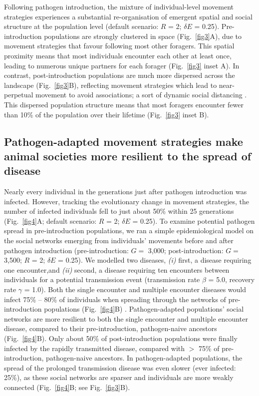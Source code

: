 Following pathogen introduction, the mixture of individual-level movement strategies experiences a substantial re-organisation of emergent spatial and social structure at the population level (default scenario: $R$ = 2; $\delta E$ = 0.25).
Pre-introduction populations are strongly clustered in space (Fig.~\ref{fig3}A), due to movement strategies that favour following most other foragers.
This spatial proximity means that most individuals encounter each other at least once, leading to numerous unique partners for each forager (Fig.~\ref{fig3} inset A).
In contrast, post-introduction populations are much more dispersed across the landscape (Fig.~\ref{fig3}B), reflecting movement strategies which lead to near-perpetual movement to avoid associations; a sort of dynamic social distancing \citep{pusceddu2021}.
This dispersed population structure means that most foragers encounter fewer than 10\% of the population over their lifetime (Fig.~\ref{fig3} inset B).

\subsection*{Pathogen-adapted movement strategies make animal societies more resilient to the spread of disease}

Nearly every individual in the generations just after pathogen introduction was infected.
However, tracking the evolutionary change in movement strategies, the number of infected individuals fell to just about 50\% within 25 generations (Fig.~\ref{fig4}A; default scenario: $R$ = 2; $\delta E$ = 0.25).
To examine potential pathogen spread in pre-introduction populations, we ran a simple epidemiological model on the social networks emerging from individuals' movements before and after pathogen introduction (pre-introduction: $G =$ 3,000; post-introduction: $G =$ 3,500; $R$ = 2; $\delta E$ = 0.25).
We modelled two diseases, \textit{(i)} first, a disease requiring one encounter,and \textit{(ii)} second, a disease requiring ten encounters between individuals for a potential transmission event (transmission rate $\beta$ = 5.0, recovery rate $\gamma$ = 1.0).
Both the single encounter and multiple encounter diseases would infect 75\% -- 80\% of individuals when spreading through the networks of pre-introduction populations (Fig.~\ref{fig4}B)
.
Pathogen-adapted populations' social networks are more resilient to both the single encounter and multiple encounter disease, compared to their pre-introduction, pathogen-naive ancestors (Fig.~\ref{fig4}B).
Only about 50\% of post-introduction populations were finally infected by the rapidly transmitted disease, compared with $>$ 75\% of pre-introduction, pathogen-naive ancestors.
In pathogen-adapted populations, the spread of the prolonged transmission disease was even slower (ever infected: 25\%), as these social networks are sparser and individuals are more weakly connected (Fig.~\ref{fig4}B; see Fig.~\ref{fig3}B).

